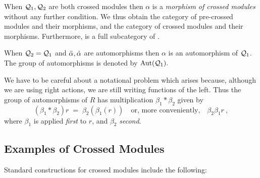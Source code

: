 When  $\mathcal{Q}_1, \mathcal{Q}_2$  are both crossed modules then  $\alpha$
is a \emph{morphism of crossed modules} 
without any further condition.
We thus obtain the category
{{\catPreXMod}} of pre-crossed modules and their morphisms,
and the category {\catXMod} of crossed modules and their morphisms.
Furthermore, {\catXMod} is a full subcategory of {\catPreXMod}.

When $\mathcal{Q}_2 = \mathcal{Q}_1$
and $\ddot{\alpha},\dot{\alpha}$ are automorphisms then 
$\alpha$  is an automorphism of $\mathcal{Q}_1$. 
The group of automorphisms is denoted 
by $\rm{Aut}(\mathcal{Q}_1).$ 

We have to be careful about a notational problem 
which arises because, although we are using right actions,
we are still writing functions of the left.
Thus the group of automorphisms of $R$ has multiplication
$\beta_1 * \beta_2$  given by
$$ 
(\beta_1 * \beta_2)r \;=\; \beta_2(\beta_1(r))
\quad \mbox{or, more conveniently,} \quad
\beta_2 \beta_1 r~,
$$ 
where $\beta_1$ is applied \emph{first} to $r$, 
and $\beta_2$ \emph{second}.



\subsection{Examples of Crossed Modules}

Standard constructions for crossed modules include the following:

